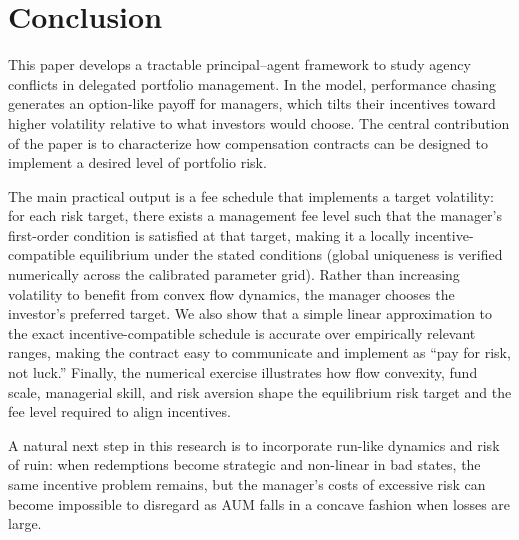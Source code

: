 \section{Conclusion}
\label{sec:conclusion}
This paper develops a tractable principal--agent framework to study agency conflicts in delegated portfolio management. In the model, performance chasing generates an option-like payoff for managers, which tilts their incentives toward higher volatility relative to what investors would choose. The central contribution of the paper is to characterize how compensation contracts can be designed to implement a desired level of portfolio risk.

The main practical output is a fee schedule that implements a target volatility: for each risk target, there exists a management fee level such that the manager's first-order condition is satisfied at that target, making it a locally incentive-compatible equilibrium under the stated conditions (global uniqueness is verified numerically across the calibrated parameter grid). Rather than increasing volatility to benefit from convex flow dynamics, the manager chooses the investor's preferred target. We also show that a simple linear approximation to the exact incentive-compatible schedule is accurate over empirically relevant ranges, making the contract easy to communicate and implement as ``pay for risk, not luck.'' Finally, the numerical exercise illustrates how flow convexity, fund scale, managerial skill, and risk aversion shape the equilibrium risk target and the fee level required to align incentives.

A natural next step in this research is to incorporate run-like dynamics and risk of ruin: when redemptions become strategic and non-linear in bad states, the same incentive problem remains, but the manager's costs of excessive risk can become impossible to disregard as AUM falls in a concave fashion when losses are large.
